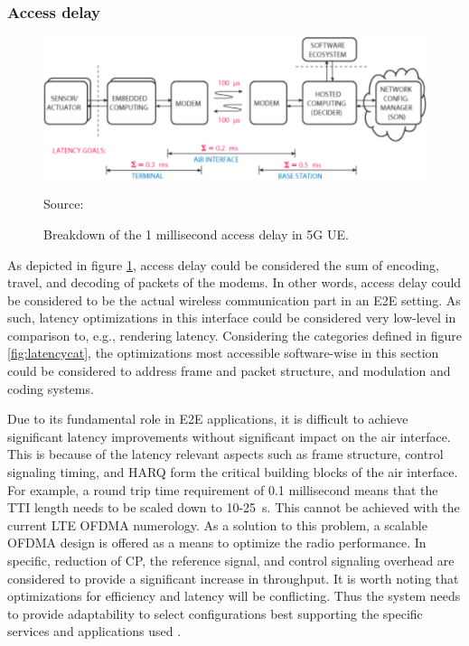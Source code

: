 \documentclass[12pt]{article}
\newcommand{\source}[1]{\caption*{Source: {#1}} }
\begin{document}
\subsubsection{Access delay}

\begin{figure}
  \centering
    \includegraphics[width=\textwidth]{assets/access.png}
  \caption{Breakdown of the 1 millisecond access delay in \gls{5G} \gls{UE}.}
  \source{\cite{fettweis20125g}}
  \label{fig:access}
\end{figure}

As depicted in figure \ref{fig:access}, access delay could be considered the sum of encoding, travel, and decoding of packets of the modems. In other words, access delay could be considered to be the actual wireless communication part in an \gls{E2E} setting. As such, latency optimizations in this interface could be considered very low-level in comparison to, e.g., rendering latency. Considering the categories defined in figure \ref{fig:latencycat}, the optimizations most accessible software-wise in this section could be considered to address frame and packet structure, and modulation and coding systems.

Due to its fundamental role in \gls{E2E} applications, it is difficult to achieve significant latency improvements without significant impact on the air interface. This is because of the latency relevant aspects such as frame structure, control signaling timing, and \gls{HARQ} form the critical building blocks of the air interface. For example, a round trip time requirement of 0.1 millisecond means that the \gls{TTI} length needs to be scaled down to 10-25~{\textmu s}. This cannot be achieved with the current \gls{LTE} \gls{OFDMA} numerology. As a solution to this problem, a scalable \gls{OFDMA} design is offered as a means to optimize the radio performance. In specific, reduction of \gls{CP}, the reference signal, and control signaling overhead are considered to provide a significant increase in throughput. It is worth noting that optimizations for efficiency and latency will be conflicting. Thus the system needs to provide adaptability to select configurations best supporting the specific services and applications used \cite{raaf2011vision}.
\end{document}
